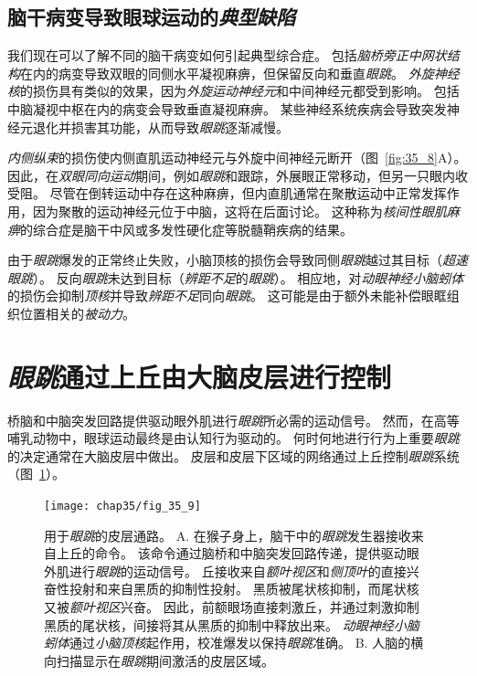 \subsection{脑干病变导致眼球运动的\textit{典型缺陷}}

我们现在可以了解不同的脑干病变如何引起典型综合症。
包括\textit{脑桥旁正中网状结构}在内的病变导致双眼的同侧水平凝视麻痹，但保留反向和垂直\textit{眼跳}。
\textit{外旋神经核}的损伤具有类似的效果，因为\textit{外旋运动神经元}和中间神经元都受到影响。
包括中脑凝视中枢在内的病变会导致垂直凝视麻痹。
某些神经系统疾病会导致突发神经元退化并损害其功能，从而导致\textit{眼跳}逐渐减慢。


\textit{内侧纵束}的损伤使内侧直肌运动神经元与外旋中间神经元断开（图~\ref{fig:35_8}A）。
因此，在\textit{双眼同向运动}期间，例如\textit{眼跳}和跟踪，外展眼正常移动，但另一只眼内收受阻。
尽管在倒转运动中存在这种麻痹，但内直肌通常在聚散运动中正常发挥作用，因为聚散的运动神经元位于中脑，这将在后面讨论。
这种称为\textit{核间性眼肌麻痹}的综合症是脑干中风或多发性硬化症等脱髓鞘疾病的结果。


由于\textit{眼跳}爆发的正常终止失败，小脑顶核的损伤会导致同侧\textit{眼跳}越过其目标（\textit{超速眼跳}）。
反向\textit{眼跳}未达到目标（\textit{辨距不足}的\textit{眼跳}）。
相应地，对\textit{动眼神经小脑蚓体}的损伤会抑制\textit{顶核}并导致\textit{辨距不足}同向\textit{眼跳}。
这可能是由于额外未能补偿眼眶组织位置相关的\textit{被动力}。



\section{\textit{眼跳}通过上丘由大脑皮层进行控制}

桥脑和中脑突发回路提供驱动眼外肌进行\textit{眼跳}所必需的运动信号。
然而，在高等哺乳动物中，眼球运动最终是由认知行为驱动的。
何时何地进行行为上重要\textit{眼跳}的决定通常在大脑皮层中做出。
皮层和皮层下区域的网络通过上丘控制\textit{眼跳}系统（图~\ref{fig:35_9}）。


\begin{figure}[htbp]
	\centering
	\texttt{[image: chap35/fig\_35\_9]}
	\caption{用于\textit{眼跳}的皮层通路。
		A. 在猴子身上，脑干中的\textit{眼跳}发生器接收来自上丘的命令。
		该命令通过脑桥和中脑突发回路传递，提供驱动眼外肌进行\textit{眼跳}的运动信号。
		丘接收来自\textit{额叶视区}和\textit{侧顶叶}的直接兴奋性投射和来自黑质的抑制性投射。
		黑质被尾状核抑制，而尾状核又被\textit{额叶视区}兴奋。
		因此，前额眼场直接刺激丘，并通过刺激抑制黑质的尾状核，间接将其从黑质的抑制中释放出来。
		\textit{动眼神经小脑蚓体}通过\textit{小脑顶核}起作用，校准爆发以保持\textit{眼跳}准确。
		B. 人脑的横向扫描显示在\textit{眼跳}期间激活的皮层区域\cite{curtis2008saccade}。}
	\label{fig:35_9}
\end{figure}



